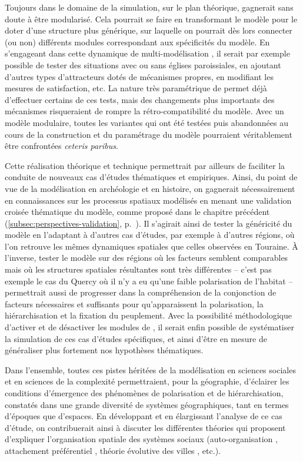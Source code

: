 Toujours dans le domaine de la simulation, sur le plan théorique, \simfeodal{} gagnerait sans doute à être \og modularisé\fg{}. Cela pourrait se faire en transformant le modèle pour le doter d'une structure plus générique, sur laquelle on pourrait dès lors connecter (ou non) différents \og modules\fg{} correspondant aux spécificités du modèle. En s'engageant dans cette dynamique de multi-modélisation \autocite{cottineau_chapter_2019}, il serait par exemple possible de tester des situations avec ou sans églises paroissiales, en ajoutant d'autres types d'attracteurs dotés de mécanismes propres, en modifiant les mesures de satisfaction, etc. La nature très paramétrique de \simfeodal{} permet déjà d'effectuer certains de ces tests, mais des changements plus importants des mécanismes risqueraient de rompre la rétro-compatibilité du modèle. Avec un modèle modulaire, toutes les variantes qui ont été testées puis abandonnées au cours de la construction et du paramétrage du modèle pourraient véritablement être confrontées \textit{ceteris paribus}.

Cette réalisation théorique et technique permettrait par ailleurs de faciliter la conduite de nouveaux cas d'études thématiques et empiriques. Ainsi, du point de vue de la modélisation en archéologie et en histoire, on gagnerait nécessairement en connaissances sur les processus spatiaux modélisés en menant une \og validation croisée\fg{} thématique du modèle, comme proposé dans le chapitre précédent (\cref{subsec:perspectives-validation}, p.~\pageref{par:validation-croisee}). Il s'agirait ainsi de tester la généricité du modèle en l'adaptant à d'autres cas d'études, par exemple à d'autres régions, où l'on retrouve les mêmes dynamiques spatiales que celles observées en Touraine. À l'inverse, tester le modèle sur des régions où les facteurs semblent comparables mais où les structures spatiales résultantes sont très différentes -- c'est pas exemple le cas du Quercy où il n'y a eu qu'une faible polarisation de l'habitat -- permettrait aussi de progresser dans la compréhension de la conjonction de facteurs nécessaires et suffisants pour qu'apparaissent la polarisation, la hiérarchisation et la fixation du peuplement. Avec la possibilité méthodologique d'activer et de désactiver les \og modules\fg{} de \simfeodal{}, il serait enfin possible de systématiser la simulation de ces cas d'études spécifiques, et ainsi d'être en mesure de généraliser plus fortement nos hypothèses thématiques.

Dans l'ensemble, toutes ces pistes héritées de la modélisation en sciences sociales et en sciences de la complexité permettraient, pour la géographie, d'éclairer les conditions d'émergence des phénomènes de polarisation et de hiérarchisation, constatés dans une grande diversité de systèmes géographiques, tant en termes d'époques que d'espaces. En développant et en élargissant l'analyse de ce cas d'étude, on contribuerait ainsi à discuter les différentes théories qui proposent d'expliquer l'organisation spatiale des systèmes sociaux (auto-organisation \autocite{saint1989villes}, attachement préférentiel \autocite{albert_statistical_2002}, théorie évolutive des villes \autocite{pumain_pour_1997}, etc.).


